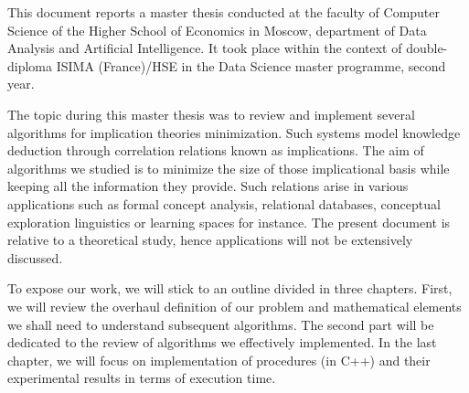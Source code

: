 \documentclass[a4paper]{report}
\begin{document}
\tableofcontents



This document reports a master thesis conducted at the faculty of Computer Science of the Higher School of Economics in Moscow, department of Data Analysis and Artificial Intelligence. It took place within the context of double-diploma ISIMA (France)/HSE in the Data Science master programme, second year.

\vspace{1.2em}

The topic during this master thesis was to review and implement several algorithms for implication theories minimization. Such systems model knowledge deduction through correlation relations known as implications. The aim of algorithms we studied is to minimize the size of those implicational basis while
keeping all the information they provide. Such relations arise in various applications such as formal concept analysis, relational databases, conceptual exploration linguistics or learning spaces for instance. The present
document is relative to a theoretical study, hence applications will not be extensively discussed.

\vspace{1.2em}

To expose our work, we will stick to an outline divided in three chapters. First, we will review the overhaul definition of our problem and mathematical elements we shall need to understand subsequent algorithms. The second part will be dedicated to the review of algorithms we effectively implemented. In
the last chapter, we will focus on implementation of procedures (in C++) and their experimental results in terms of execution time.













\newpage
{}
\setcounter{page}{8}


	

\newpage
\end{document}
